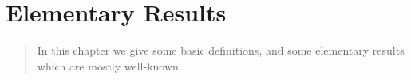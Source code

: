\documentclass[../main]{subfiles}
\begin{document}
\chapter{Elementary Results}\label{ch:01}

\begin{quote}
In this chapter we give some basic definitions, and some elementary results which are mostly well-known. 
\end{quote}



\end{document}
